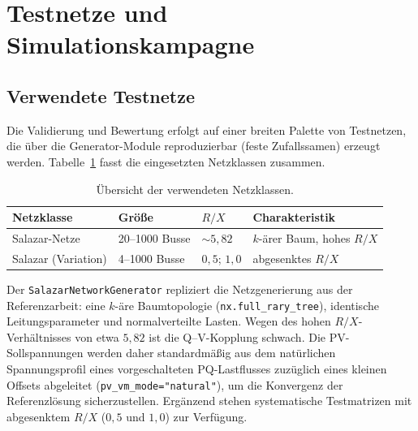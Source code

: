 \section{Testnetze und Simulationskampagne}
\label{sec:testnetze}

\subsection{Verwendete Testnetze}

Die Validierung und Bewertung erfolgt auf einer breiten Palette von Testnetzen, die
über die Generator-Module reproduzierbar (feste Zufallssamen) erzeugt werden.
Tabelle~\ref{tab:netzklassen} fasst die eingesetzten Netzklassen zusammen.

\begin{table}[htbp]
	\centering
	\caption{Übersicht der verwendeten Netzklassen.}
	\label{tab:netzklassen}
	\begin{tabular}{llll}
		\toprule
		\textbf{Netzklasse} & \textbf{Größe} & \textbf{$R/X$} & \textbf{Charakteristik} \\
		\midrule
		Salazar-Netze     & 20--1000 Busse & $\sim 5{,}82$ & $k$-ärer Baum, hohes $R/X$ \\
		Salazar (Variation) & 4--1000 Busse & $0{,}5$; $1{,}0$ & abgesenktes $R/X$ \\
		\bottomrule
	\end{tabular}
\end{table}

Der \texttt{SalazarNetworkGenerator} repliziert die
Netzgenerierung aus der Referenzarbeit: eine $k$-äre Baumtopologie
(\texttt{nx.full\_rary\_tree}), identische Leitungsparameter und normalverteilte Lasten.
Wegen des hohen $R/X$-Verhältnisses von etwa $5{,}82$ ist die Q--V-Kopplung schwach.
Die PV-Sollspannungen werden daher standardmäßig aus dem natürlichen Spannungsprofil
eines vorgeschalteten PQ-Lastflusses zuzüglich eines kleinen Offsets abgeleitet
(\texttt{pv\_vm\_mode="natural"}), um die Konvergenz der Referenzlösung sicherzustellen.
Ergänzend stehen systematische Testmatrizen mit abgesenktem $R/X$ ($0{,}5$ und $1{,}0$)
zur Verfügung.

